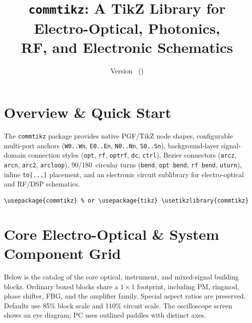 \documentclass[11pt,a4paper]{article}
\title{\textbf{\texttt{commtikz}: A TikZ Library for Electro-Optical, Photonics,\\RF, and Electronic Schematics}}
\author{}
\date{Version \commtikzversion\ (\commtikzversiondate)}
\begin{document}
\maketitle

\section{Overview \& Quick Start}
The \texttt{commtikz} package provides native PGF/TikZ node shapes, configurable multi-port anchors (\texttt{W0..Wn}, \texttt{E0..En}, \texttt{N0..Nn}, \texttt{S0..Sn}), background-layer signal-domain connection styles (\texttt{opt}, \texttt{rf}, \texttt{optrf}, \texttt{dc}, \texttt{ctrl}), Bezier connectors (\texttt{arcz}, \texttt{arcn}, \texttt{arc2}, \texttt{arcloop}), 90\textdegree/180\textdegree\ circular turns (\texttt{bend}, \texttt{opt bend}, \texttt{rf bend}, \texttt{uturn}), inline \texttt{to[...]} placement, and an electronic circuit sublibrary for electro-optical and RF/DSP schematics.

\begin{lstlisting}
\usepackage{commtikz} % or \usepackage{tikz} \usetikzlibrary{commtikz}
\end{lstlisting}

\section{Core Electro-Optical \& System Component Grid}
Below is the catalog of the core optical, instrument, and mixed-signal building blocks.
Ordinary boxed blocks share a $1\times1$ footprint, including PM, ringmod,
phase shifter, FBG, and the amplifier family. Special aspect ratios are preserved.
Defaults use 85\% block scale and 110\% circuit scale. The oscilloscope
screen shows an eye diagram; PC uses outlined paddles with distinct axes.
\end{document}
